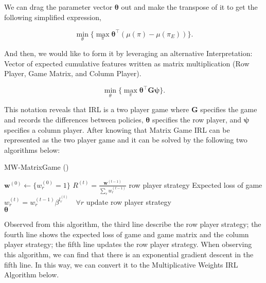 \documentclass[11pt]{article}
\DeclareMathOperator*{\minimize}{min}
\DeclareMathOperator*{\maximize}{max}
\begin{document}
We can drag the parameter vector $\boldsymbol{\theta}$ out and make the transpose of it to get the following simplified expression, 

\begin{equation}
    \minimize_{\theta}\{\maximize_{\pi} \boldsymbol{\theta^{\top}} (\mu(\pi) - \mu(\pi_E))\}.
\end{equation}

And then, we would like to form it by leveraging an alternative Interpretation: Vector of expected cumulative features written as matrix multiplication (Row Player, Game Matrix, and Column Player).

\begin{equation}
    \minimize_{\theta}\{\maximize_{\pi} \boldsymbol{\theta^{\top}} \boldsymbol{G} \boldsymbol{\psi}\}.
\end{equation}


This notation reveals that IRL is a two player game where $\boldsymbol{G}$ specifies the game and records the differences between policies, $\boldsymbol{\theta}$ specifies the row player, and $\boldsymbol{\psi}$ specifies a column player.
%
After knowing that Matrix Game IRL can be represented as the two player game and it can be solved by the following two algorithms below:


\begin{algorithm}[H]
    \label{algo:mw_matrix_game}
    \caption{MW-MatrixGame (\beta)}
    \begin{algorithmic}[1]
    \State $\boldsymbol{w}^{(0)} \leftarrow \{ w_r^{(0)} = 1\}$
    \State $R^{(t)} = \frac{\boldsymbol{w}^{(t-1)}}{\sum_r w_r^{(t-1)}}$ \hfill row player 
strategy
    \State {} \hfill Expected loss of game
    \State $w_r^{(t)} = w_r^{(t-1)} \beta^{l_r^{(t)}} \quad \forall r$ \hfill update row 
player strategy
    \EndFor \\
    \Return $\boldsymbol{\theta}$
    \end{algorithmic}
\end{algorithm}

Observed from this algorithm, the third line describe the row player strategy; the fourth line shows the expected loss of game and game matrix and the column player strategy; the fifth line updates the row player strategy.
%
When observing this algorithm, we can find that there is an exponential gradient descent in the fifth line. In this way, we can convert it to the Multiplicative Weights IRL Algorithm below.
\end{document}
